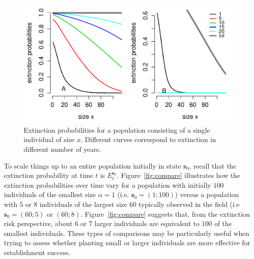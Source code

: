 \documentclass[12pt]{amsart}\usepackage[]{graphicx}\usepackage[]{color}
\makeatletter
\def\maxwidth{ %
  \ifdim\Gin@nat@width>\linewidth
    \linewidth
  \else
    \Gin@nat@width
  \fi
}
\newenvironment{knitrout}{}{} %
\def\s{\mathbf s}
\makeatother
\begin{document}
\begin{knitrout}
\color{fgcolor}\begin{figure}
\includegraphics[width=\maxwidth]{figure/extinction-1} \caption[Extinction probabilities for a population consisting of a single individual of size ]{Extinction probabilities for a population consisting of a single individual of size $x$. Different curves correspond to extinction in different number of years.}\label{fig:extinction}
\end{figure}


\end{knitrout}

To scale things up to an entire population initially in state $\s_0$, recall that the extinction probability at time $t$ is $E_t^{\s_0}$. Figure~\ref{fig:compare} illustrates how the extinction probabilities over time vary for a population with initially $100$ individuals of the smallest size $\alpha=1$ (i.e. $\s_0=(1;100)$) versus a population with $5$ or $8$ individuals of the largest size $60$ typically observed in the field (i.e $\s_0=(60;5)$ or $(60;8)$. Figure~\ref{fig:compare} suggests that, from the extinction risk perspective, about $6$ or $7$ larger individuals are equivalent to $100$ of the smallest individuals. These types of comparisons may be particularly useful when trying to assess whether planting small or larger individuals are more effective for establishment success.
\end{document}
